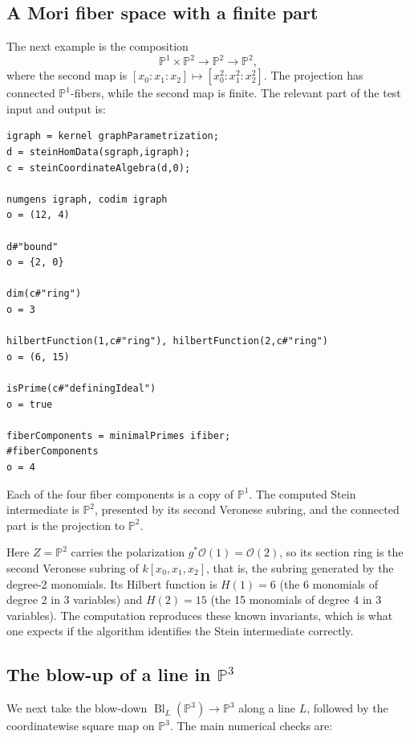 \documentclass[11pt,reqno]{amsart}
\newcommand{\PP}{\ensuremath{\mathbb{P}}}
\newcommand{\sO}{\ensuremath{\mathcal{O}}}
\DeclareMathOperator{\Bl}{Bl}
\theoremstyle{plain}
\theoremstyle{definition}
\begin{document}
\subsection{A Mori fiber space with a finite part}\label{sec:mori}

The next example is the composition
\[\PP^1 \times \PP^2 \to \PP^2 \to \PP^2,\]
where the second map is \([x_0:x_1:x_2] \mapsto [x_0^2:x_1^2:x_2^2]\).
The projection has connected \(\PP^1\)-fibers, while the second map is
finite. The relevant part of the test input and output is:

\begin{verbatim}
igraph = kernel graphParametrization;
d = steinHomData(sgraph,igraph);
c = steinCoordinateAlgebra(d,0);

numgens igraph, codim igraph
o = (12, 4)

d#"bound"
o = {2, 0}

dim(c#"ring")
o = 3

hilbertFunction(1,c#"ring"), hilbertFunction(2,c#"ring")
o = (6, 15)

isPrime(c#"definingIdeal")
o = true

fiberComponents = minimalPrimes ifiber;
#fiberComponents
o = 4
\end{verbatim}

Each of the four fiber components is a copy of \(\PP^1\). The computed
Stein intermediate is \(\PP^2\), presented by its second Veronese
subring, and the connected part is the projection to \(\PP^2\).

Here \(Z=\PP^2\) carries the polarization \(g^*\sO(1)=\sO(2)\), so its section
ring is the second Veronese subring of \(k[x_0,x_1,x_2]\), that is, the
subring generated by the degree-2 monomials. Its Hilbert
function is \(H(1)=6\) (the 6 monomials of degree 2 in 3 variables) and
\(H(2)=15\) (the 15 monomials of degree 4 in 3 variables). The
computation reproduces these known invariants, which is what one expects
if the algorithm identifies the Stein intermediate correctly.

\subsection{\texorpdfstring{The blow-up of a line in \(\PP^3\)}%
                           {The blow-up of a line in P3}}\label{sec:blowup-line}

We next take the blow-down \(\Bl_L(\PP^3)\to\PP^3\) along a line
\(L\), followed by the coordinatewise square map on \(\PP^3\). The main
numerical checks are:
\end{document}
